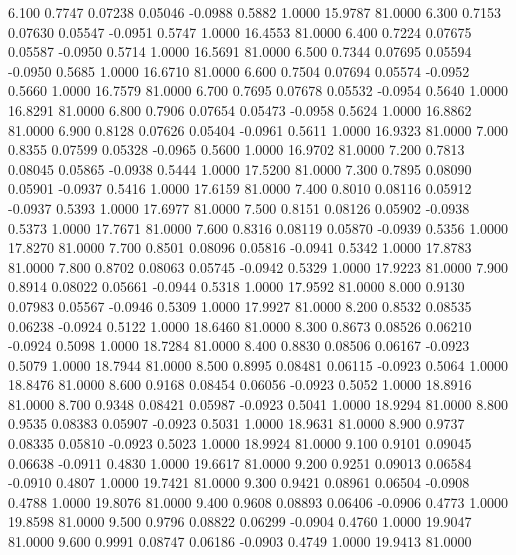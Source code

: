    6.100   0.7747   0.07238   0.05046  -0.0988   0.5882   1.0000  15.9787  81.0000
   6.300   0.7153   0.07630   0.05547  -0.0951   0.5747   1.0000  16.4553  81.0000
   6.400   0.7224   0.07675   0.05587  -0.0950   0.5714   1.0000  16.5691  81.0000
   6.500   0.7344   0.07695   0.05594  -0.0950   0.5685   1.0000  16.6710  81.0000
   6.600   0.7504   0.07694   0.05574  -0.0952   0.5660   1.0000  16.7579  81.0000
   6.700   0.7695   0.07678   0.05532  -0.0954   0.5640   1.0000  16.8291  81.0000
   6.800   0.7906   0.07654   0.05473  -0.0958   0.5624   1.0000  16.8862  81.0000
   6.900   0.8128   0.07626   0.05404  -0.0961   0.5611   1.0000  16.9323  81.0000
   7.000   0.8355   0.07599   0.05328  -0.0965   0.5600   1.0000  16.9702  81.0000
   7.200   0.7813   0.08045   0.05865  -0.0938   0.5444   1.0000  17.5200  81.0000
   7.300   0.7895   0.08090   0.05901  -0.0937   0.5416   1.0000  17.6159  81.0000
   7.400   0.8010   0.08116   0.05912  -0.0937   0.5393   1.0000  17.6977  81.0000
   7.500   0.8151   0.08126   0.05902  -0.0938   0.5373   1.0000  17.7671  81.0000
   7.600   0.8316   0.08119   0.05870  -0.0939   0.5356   1.0000  17.8270  81.0000
   7.700   0.8501   0.08096   0.05816  -0.0941   0.5342   1.0000  17.8783  81.0000
   7.800   0.8702   0.08063   0.05745  -0.0942   0.5329   1.0000  17.9223  81.0000
   7.900   0.8914   0.08022   0.05661  -0.0944   0.5318   1.0000  17.9592  81.0000
   8.000   0.9130   0.07983   0.05567  -0.0946   0.5309   1.0000  17.9927  81.0000
   8.200   0.8532   0.08535   0.06238  -0.0924   0.5122   1.0000  18.6460  81.0000
   8.300   0.8673   0.08526   0.06210  -0.0924   0.5098   1.0000  18.7284  81.0000
   8.400   0.8830   0.08506   0.06167  -0.0923   0.5079   1.0000  18.7944  81.0000
   8.500   0.8995   0.08481   0.06115  -0.0923   0.5064   1.0000  18.8476  81.0000
   8.600   0.9168   0.08454   0.06056  -0.0923   0.5052   1.0000  18.8916  81.0000
   8.700   0.9348   0.08421   0.05987  -0.0923   0.5041   1.0000  18.9294  81.0000
   8.800   0.9535   0.08383   0.05907  -0.0923   0.5031   1.0000  18.9631  81.0000
   8.900   0.9737   0.08335   0.05810  -0.0923   0.5023   1.0000  18.9924  81.0000
   9.100   0.9101   0.09045   0.06638  -0.0911   0.4830   1.0000  19.6617  81.0000
   9.200   0.9251   0.09013   0.06584  -0.0910   0.4807   1.0000  19.7421  81.0000
   9.300   0.9421   0.08961   0.06504  -0.0908   0.4788   1.0000  19.8076  81.0000
   9.400   0.9608   0.08893   0.06406  -0.0906   0.4773   1.0000  19.8598  81.0000
   9.500   0.9796   0.08822   0.06299  -0.0904   0.4760   1.0000  19.9047  81.0000
   9.600   0.9991   0.08747   0.06186  -0.0903   0.4749   1.0000  19.9413  81.0000
